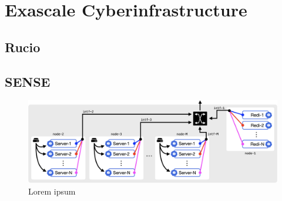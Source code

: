 \chapter{Exascale Cyberinfrastructure}

\section{Rucio}

\section{SENSE}

\begin{figure}[htb]
  \centering
  \includegraphics[width=.9\textwidth]{fig/cyber/rucio-sense_site.png}
  \caption{Lorem ipsum}
  \label{fig:rucio_sense_site}
\end{figure}

